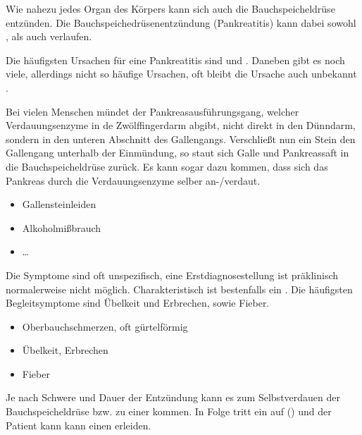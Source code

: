 {Wie nahezu jedes Organ des Körpers kann sich auch die
Bauchspeicheldrüse entzünden. Die
Bauchspeichedrüsenentzündung (Pankreatitis) kann dabei
sowohl , als auch  verlaufen. 


{
Die häufigsten Ursachen für eine Pankreatitis sind
 und 
\citep{SiewertChirurgie8-07.14-Pankreas,ScholzNotfallmedizin2}.
Daneben gibt es noch viele, allerdings nicht so häufige
Ursachen, oft bleibt die Ursache auch unbekannt
\citep{HeroldInnereMedizin2005}.

 Bei vielen Menschen mündet der
Pankreasausführungsgang, welcher Verdauungsenzyme in de
Zwölffingerdarm abgibt, nicht direkt in den Dünndarm,
sondern in den unteren Abschnitt des Gallengangs.
Verschließt nun ein Stein den Gallengang unterhalb der
Einmündung, so staut sich Galle und Pankreassaft in die
Bauchspeicheldrüse zurück. Es kann sogar dazu kommen, dass
sich das Pankreas durch die Verdauungsenzyme selber
an-/verdaut.

}
{\begin{itemize}
  \item Gallensteinleiden
  \item Alkoholmißbrauch
  \item \ldots
\end{itemize}}
{}
{}
{}

{Die Symptome sind oft unspezifisch, eine
Erstdiagnosestellung ist präklinisch normalerweise nicht
möglich. Charakteristisch ist bestenfalls ein
.
Die häufigsten Begleitsymptome sind Übelkeit und Erbrechen,
sowie Fieber. \citep{HeroldInnereMedizin2005}


\bigskip

\bigskip
}
{\begin{itemize}
  \item Oberbauchschmerzen, oft gürtelförmig
  \item Übelkeit, Erbrechen
  \item Fieber
\end{itemize}}
{}
{}
{}

{Je nach Schwere und Dauer der Entzündung kann es zum
Selbstverdauen der Bauchspeicheldrüse bzw. zu einer
 kommen. In Folge tritt ein
 auf
() und der Patient kann
kann einen  erleiden.

}}
